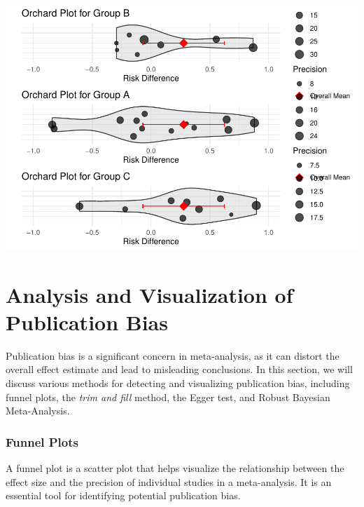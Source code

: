 \documentclass[
]{book}
\begin{document}
\includegraphics{_main_files/figure-latex/unnamed-chunk-31-1.pdf}

\chapter{Analysis and Visualization of Publication Bias}\label{analysis-and-visualization-of-publication-bias}

Publication bias is a significant concern in meta-analysis, as it can distort the overall effect estimate and lead to misleading conclusions. In this section, we will discuss various methods for detecting and visualizing publication bias, including funnel plots, the \emph{trim and fill} method, the Egger test, and Robust Bayesian Meta-Analysis.

\subsection{Funnel Plots}\label{funnel-plots}

A funnel plot is a scatter plot that helps visualize the relationship between the effect size and the precision of individual studies in a meta-analysis. It is an essential tool for identifying potential publication bias.
\end{document}
